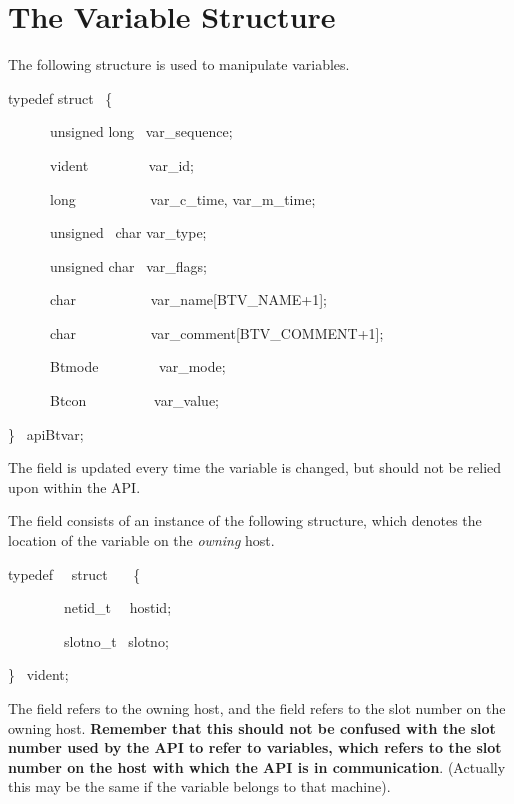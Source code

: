\chapter{The Variable Structure}
\label{chp:the-variable-structure}
\label{bkm:Varstructure}The following structure is used to manipulate variables.

\begin{expara}

typedef struct \ \{

\ \ \ \ \ \ unsigned long \ var\_sequence;

\ \ \ \ \ \ vident \ \ \ \ \ \ \ \ var\_id;

\ \ \ \ \ \ long \ \ \ \ \ \ \ \ \ \ var\_c\_time, var\_m\_time;

\ \ \ \ \ \ unsigned \ char var\_type;

\ \ \ \ \ \ unsigned char \ var\_flags;

\ \ \ \ \ \ char \ \ \ \ \ \ \ \ \ \ var\_name[BTV\_NAME+1];

\ \ \ \ \ \ char \ \ \ \ \ \ \ \ \ \ var\_comment[BTV\_COMMENT+1];

\ \ \ \ \ \ Btmode \ \ \ \ \ \ \ \ var\_mode;

\ \ \ \ \ \ Btcon \ \ \ \ \ \ \ \ \ var\_value;

\} \ apiBtvar;

\end{expara}

The field  is updated every time the
variable is changed, but should not be relied upon within the API.

The field  consists of an instance of the
following structure, which denotes the location of the variable on the
\textit{owning} host.

\begin{expara}

typedef \ \ struct \ \ \ \{

\ \ \ \ \ \ \ \ netid\_t \ \ hostid;

\ \ \ \ \ \ \ \ slotno\_t \ slotno;

\} \ vident;

\end{expara}

The field  refers to the owning host, and the  field refers to the slot number on the
owning host. \textbf{Remember that this should not be confused with the slot number used by the API to refer to variables, which refers to the
slot number on the host with which the API is in communication}. (Actually this may be the same if the variable belongs to that machine).

